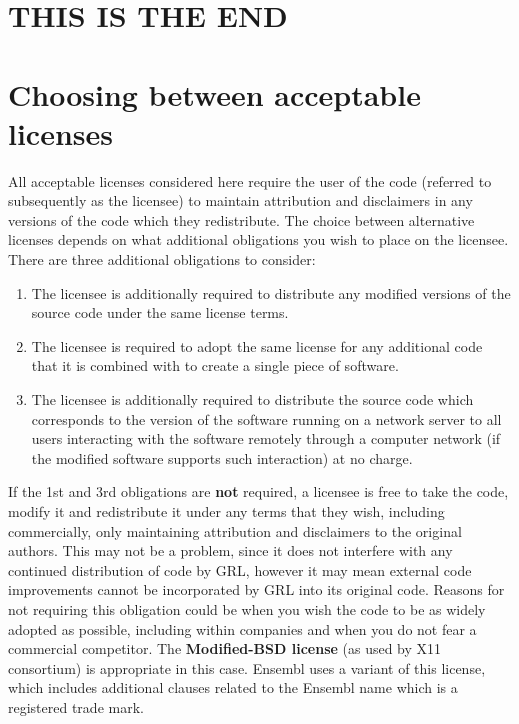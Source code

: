 \documentclass[10pt,a4paper]{article}
\begin{document}
\section{THIS IS THE END}


\section{Choosing between acceptable licenses}

All acceptable licenses considered here require the user of the code (referred to 
subsequently as the licensee) to maintain attribution and disclaimers in any versions of 
the code which they redistribute. The choice between alternative licenses depends on 
what additional obligations you wish to place on the licensee. There are three additional obligations to consider: 

\begin{enumerate}
\item The licensee is additionally required to distribute any modified versions of the 
source code under the same license terms. 
\item The licensee is required to adopt the same license for any additional code that it 
is combined with to create a single piece of software. 
\item The licensee is additionally required to distribute the source code which 
corresponds to the version of the software running on a network server to all 
users interacting with the software remotely through a computer network (if the 
modified software supports such interaction) at no charge. 
\end{enumerate}

If the 1st and 3rd obligations are \textbf{not} required, a licensee is free to take the code, modify 
it and redistribute it under any terms that they wish, including commercially, only 
maintaining attribution and disclaimers to the original authors. This may not be a 
problem, since it does not interfere with any continued distribution of code by GRL, 
however it may mean external code improvements cannot be incorporated by GRL into 
its original code. Reasons for not requiring this obligation could be when you wish the 
code to be as widely adopted as possible, including within companies and when you do 
not fear a commercial competitor. The \textbf{Modified-BSD license} (as used by X11 
consortium) is appropriate in this case. Ensembl uses a variant of this license, which 
includes additional clauses related to the Ensembl name which is a registered trade 
mark. 
 
\end{document}
